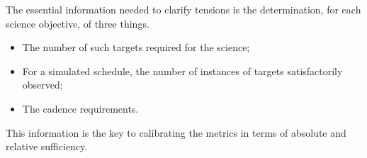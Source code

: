 The essential information needed to clarify tensions is the
determination, for each science objective, of three things.
\begin{itemize}
	\item The number of such targets required for the science;
	\item For a simulated schedule, the number of instances of targets satisfactorily observed;
	\item The cadence requirements.
\end{itemize}
This information is the key to calibrating the metrics in terms of
absolute and relative  sufficiency.

